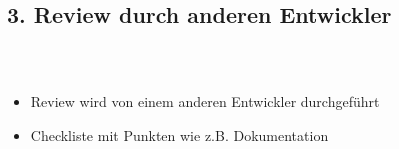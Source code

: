 \documentclass[accentcolor=tud1b,colorbacktitle,landscape,german,presentation]{tudbeamer}
\newcommand{\ftitle}{
	\frametitle{\insertsectionhead \\ {\small \insertsubsectionhead}}
}
\begin{document}
\subsection{3. Review durch anderen Entwickler}
\begin{frame}
	\ftitle
	\centering
	\vspace{-1.2cm}
	\vspace{-4.5cm}
	\begin{itemize}
		\item Review wird von einem anderen Entwickler durchgeführt\pause
		\item Checkliste mit Punkten wie z.B. Dokumentation
	\end{itemize}
\end{frame}
\end{document}
